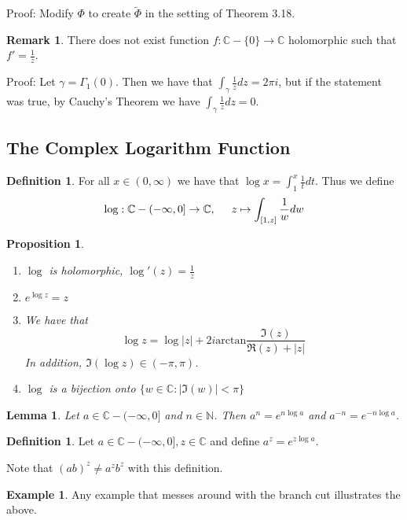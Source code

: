 \documentclass[11pt]{article}
\theoremstyle{plain}
\newtheorem{lemma}[theorem]{Lemma}
\newtheorem{proposition}[theorem]{Proposition}
\theoremstyle{definition}
\newtheorem{definition}[theorem]{Definition}
\newtheorem{remark}{Remark}
\newtheorem{example}[theorem]{Example}
\newcommand{\C}{\mathbb{C}}
\begin{document}
Proof: Modify $\Phi$ to create $\tilde{\Phi}$ in the setting of Theorem 3.18. 

\begin{remark}
There does not exist function $f: \C - \{0\} \to \C$ holomorphic such that $f' = \frac{1}{z}$.
\end{remark}

Proof: Let $\gamma = \Gamma_1(0)$. Then we have that $\int_{\gamma} \frac{1}{z}dz = 2\pi i$, but if the statement was true, by Cauchy's Theorem we have $\int_{\gamma} \frac{1}{z} dz = 0$.

\subsection{The Complex Logarithm Function}

\begin{definition}
For all $x \in (0, \infty)$ we have that $\log x = \int_1^x \frac{1}{t}dt$. Thus we define 
$$ \log : \C - (-\infty, 0] \to \C, \hspace{5mm} z \mapsto \int_{[1,z]} \frac{1}{w} dw $$
\end{definition}

\begin{proposition}
\begin{enumerate}[1.]
\item $\log$ is holomorphic, $\log'(z) = \frac{1}{z} $
\item $e^{\log z} = z $
\item We have that 
$$ \log z = \log |z| + 2i \text{arctan} \frac{\Im(z)}{\Re(z) + |z|} $$
In addition, $\Im(\log z) \in (- \pi, \pi)$.
\item $\log$ is a bijection onto $\{ w \in \C : |\Im(w)| < \pi\}$
\end{enumerate}
\end{proposition}

\begin{lemma}
Let $a \in \C - (-\infty, 0]$ and $n \in \mathbb{N}$. Then $a^n = e^{n\log a}$ and $a^{-n} = e^{-n \log a}$.
\end{lemma}

\begin{definition}
Let $a \in \C - (-\infty, 0], z \in \C$ and define $a^z = e^{z \log a}$.
\end{definition}

Note that $(ab)^z \neq a^z b^z$ with this definition.

\begin{example}
Any example that messes around with the branch cut illustrates the above.
\end{example}
\end{document}
